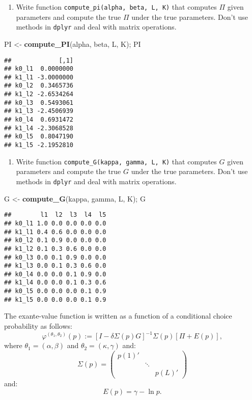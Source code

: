 \documentclass[
]{book}
\newenvironment{Shaded}{\begin{snugshade}}{\end{snugshade}}
\newcommand{\KeywordTok}[1]{\textcolor[rgb]{0.13,0.29,0.53}{\textbf{#1}}}
\newcommand{\NormalTok}[1]{#1}
\newcommand{\StringTok}[1]{\textcolor[rgb]{0.31,0.60,0.02}{#1}}
\providecommand{\tightlist}{%
  \setlength{\itemsep}{0pt}\setlength{\parskip}{0pt}}
\begin{document}
\begin{enumerate}
\def\labelenumi{\arabic{enumi}.}
\setcounter{enumi}{1}
\tightlist
\item
  Write function \texttt{compute\_pi(alpha,\ beta,\ L,\ K)} that computes \(\Pi\) given parameters and compute the true \(\Pi\) under the true parameters. Don't use methods in \texttt{dplyr} and deal with matrix operations.
\end{enumerate}

\begin{Shaded}
\begin{Highlighting}[]
\NormalTok{PI <-}\StringTok{ }\KeywordTok{compute_PI}\NormalTok{(alpha, beta, L, K); PI}
\end{Highlighting}
\end{Shaded}

\begin{verbatim}
##             [,1]
## k0_l1  0.0000000
## k1_l1 -3.0000000
## k0_l2  0.3465736
## k1_l2 -2.6534264
## k0_l3  0.5493061
## k1_l3 -2.4506939
## k0_l4  0.6931472
## k1_l4 -2.3068528
## k0_l5  0.8047190
## k1_l5 -2.1952810
\end{verbatim}

\begin{enumerate}
\def\labelenumi{\arabic{enumi}.}
\setcounter{enumi}{2}
\tightlist
\item
  Write function \texttt{compute\_G(kappa,\ gamma,\ L,\ K)} that computes \(G\) given parameters and compute the true \(G\) under the true parameters. Don't use methods in \texttt{dplyr} and deal with matrix operations.
\end{enumerate}

\begin{Shaded}
\begin{Highlighting}[]
\NormalTok{G <-}\StringTok{ }\KeywordTok{compute_G}\NormalTok{(kappa, gamma, L, K); G}
\end{Highlighting}
\end{Shaded}

\begin{verbatim}
##        l1  l2  l3  l4  l5
## k0_l1 1.0 0.0 0.0 0.0 0.0
## k1_l1 0.4 0.6 0.0 0.0 0.0
## k0_l2 0.1 0.9 0.0 0.0 0.0
## k1_l2 0.1 0.3 0.6 0.0 0.0
## k0_l3 0.0 0.1 0.9 0.0 0.0
## k1_l3 0.0 0.1 0.3 0.6 0.0
## k0_l4 0.0 0.0 0.1 0.9 0.0
## k1_l4 0.0 0.0 0.1 0.3 0.6
## k0_l5 0.0 0.0 0.0 0.1 0.9
## k1_l5 0.0 0.0 0.0 0.1 0.9
\end{verbatim}

The exante-value function is written as a function of a conditional choice probability as follows:
\[
\varphi^{(\theta_1, \theta_2)}(p) := [I - \delta \Sigma(p) G]^{-1}\Sigma(p)[\Pi + E(p)],
\]
where \(\theta_1 = (\alpha, \beta)\) and \(\theta_2 = (\kappa, \gamma)\) and:
\[
\Sigma(p) =
\begin{pmatrix}
p(1)' & & \\
 & \ddots & \\
 & & p(L)'
\end{pmatrix}
\]
and:
\[
E(p) = 
\gamma - \ln p.
\]
\end{document}
